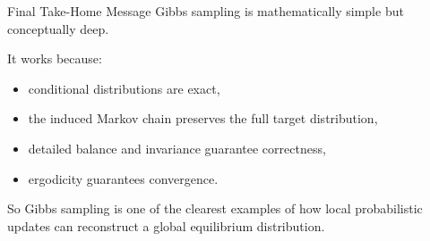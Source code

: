 \documentclass[aspectratio=169]{beamer}
\begin{document}
\begin{frame}{Final Take-Home Message}
Gibbs sampling is mathematically simple but conceptually deep.

\medskip

It works because:
\begin{itemize}
    \item conditional distributions are exact,
    \item the induced Markov chain preserves the full target distribution,
    \item detailed balance and invariance guarantee correctness,
    \item ergodicity guarantees convergence.
\end{itemize}

So Gibbs sampling is one of the clearest examples of how local probabilistic updates can reconstruct a global equilibrium distribution.
\end{frame}
\end{document}
